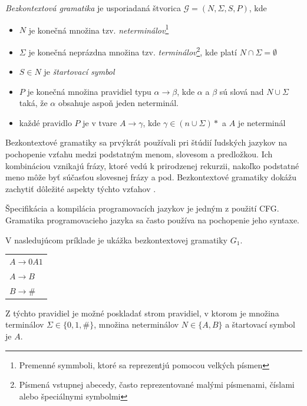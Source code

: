 \begin{definice}
\textit{Bezkontextová gramatika} je usporiadaná štvorica $\mathcal{G} = (N, \Sigma , S, P)$, kde
\begin{itemize}
\item $N$ je konečná množina tzv. \textit{neterminálov}\footnote{Premenné symmboli, ktoré sa reprezentjú pomocou velkých písmen}
\item $\Sigma$ je konečná neprázdna množina tzv. \textit{terminálov}\footnote{Písmená vstupnej abecedy, často reprezentované malými písmenami, číslami alebo špeciálnymi symbolmi}, kde platí $N \cap \Sigma = \emptyset$
\item $S \in N$ je \textit{štartovací symbol}
\item $P$ je konečná množina pravidiel typu $\alpha \rightarrow \beta$, kde $\alpha$ a $\beta$ sú slová nad $N \cup \Sigma$ taká, že $\alpha$ obsahuje aspoň jeden neterminál. 
\item každé pravidlo $P$ je v tvare $A \rightarrow \gamma$, kde $\gamma \in (n \cup \Sigma)*$ a $A$ je neterminál \cite{demlova:gramatiky}
\end{itemize}
\end{definice}

Bezkontextové gramatiky sa prvýkrát používali pri štúdií ľudských jazykov na pochopenie vzťahu medzi podstatným menom, slovesom a predložkou. Ich kombináciou vznikajú frázy, ktoré vedú k prirodzenej rekurzii, nakoľko podstatné meno môže byť súčasťou slovesnej frázy a pod. Bezkontextové gramatiky dokážu zachytiť dôležité aspekty týchto vzťahov \cite{computation_theory}.

Špecifikácia a kompilácia programovacích jazykov je jedným z použití CFG. Gramatika programovacieho jazyka sa často používa na pochopenie jeho syntaxe.

V nasledujúcom príklade je ukážka bezkontextovej gramatiky $G_1$.
\begin{center}
\begin{tabular}{p{}}
$A \rightarrow 0A1$\\
$A \rightarrow B$\\
$B \rightarrow $\#
\end{tabular}
\end{center}

Z týchto pravidiel je možné poskladať strom pravidiel, v ktorom je množina terminálov $\Sigma \in \{0,1,\#\}$, množina neterminálov $N \in \{A, B\}$ a štartovací symbol je $A$. 

